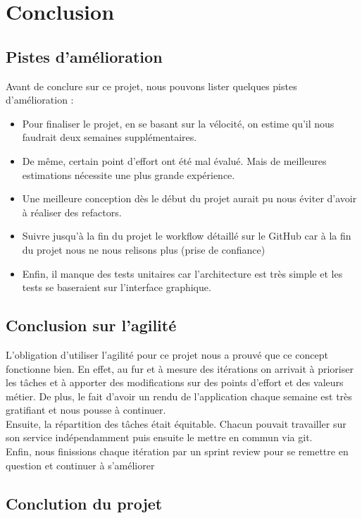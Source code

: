 \documentclass[10pt,a4paper]{article}
\begin{document}
\section{Conclusion}
\subsection{Pistes d'amélioration}

Avant de conclure sur ce projet, nous pouvons lister quelques pistes d'amélioration :
\begin{itemize}
\item Pour finaliser le projet, en se basant sur la vélocité, on estime qu'il nous faudrait deux semaines supplémentaires.
\item De même, certain point d'effort ont été mal évalué. Mais de meilleures estimations nécessite une plus grande expérience. 
\item Une meilleure conception dès le début du projet aurait pu nous éviter d'avoir à réaliser des refactors.
\item Suivre jusqu'à la fin du projet le workflow détaillé sur le GitHub car à la fin du projet nous ne nous relisons plus (prise de confiance)
\item Enfin, il manque des tests unitaires car l'architecture est très simple et les tests se baseraient sur l'interface graphique.
\end{itemize}

\subsection{Conclusion sur l'agilité}

L'obligation d'utiliser l'agilité pour ce projet nous a prouvé que ce concept fonctionne bien. En effet, au fur et à mesure des itérations on arrivait à prioriser les tâches et à apporter des modifications sur des points d'effort et des valeurs métier. 
De plus, le fait d'avoir un rendu de l'application chaque semaine est très gratifiant et nous pousse à continuer. \\
Ensuite, la répartition des tâches était équitable. Chacun pouvait travailler sur son service indépendamment puis ensuite le mettre en commun via git. \\
Enfin, nous finissions chaque itération par un sprint review pour se remettre en question et continuer à s'améliorer


\subsection{Conclution du projet}
\end{document}
